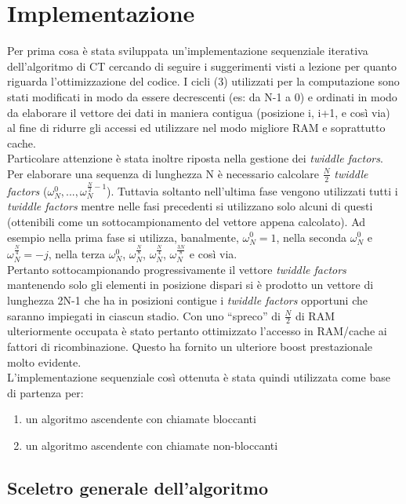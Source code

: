 \documentclass[12pt,a4paper,oneside,openright]{article}
\begin{document}
\section{Implementazione}
Per prima cosa è stata sviluppata un'implementazione sequenziale iterativa dell'algoritmo di CT cercando di seguire i suggerimenti visti a lezione per quanto riguarda l'ottimizzazione del codice. I cicli (3) utilizzati per la computazione sono stati modificati in modo da essere decrescenti (es: da N-1 a 0) e ordinati in modo da elaborare il vettore dei dati in maniera contigua (posizione i, i+1, e così via) al fine di ridurre gli accessi ed utilizzare nel modo migliore RAM e soprattutto cache.\\
Particolare attenzione è stata inoltre riposta nella gestione dei \emph{twiddle factors}.\\
Per elaborare una sequenza di lunghezza N è necessario calcolare $\frac{N}{2}$ \emph{twiddle factors} ($ \omega_{N}^{0},...,\omega_{N}^{\frac{N}{2}-1}$). Tuttavia soltanto nell'ultima fase vengono utilizzati tutti i \emph{twiddle factors} mentre nelle fasi precedenti si utilizzano solo alcuni di questi (ottenibili come un sottocampionamento del vettore appena calcolato). Ad esempio nella prima fase si utilizza, banalmente, $ \omega_{N}^{0}=1$, nella seconda $ \omega_{N}^{0}$ e $\omega_{N}^{\frac{N}{4}}=-j$, nella terza $ \omega_{N}^{0}$, $\omega_{N}^{\frac{N}{8}}$, $\omega_{N}^{\frac{N}{4}}$, $\omega_{N}^{\frac{3N}{8}}$ e così via.\\
Pertanto sottocampionando progressivamente il vettore \emph{twiddle factors} mantenendo solo gli elementi in posizione dispari si è prodotto un vettore di lunghezza 2N-1 che ha in posizioni contigue i \emph{twiddle factors} opportuni che saranno impiegati in ciascun stadio. Con uno ``spreco'' di $\frac{N}{2}$ di RAM ulteriormente occupata è stato pertanto ottimizzato l'accesso in RAM/cache ai fattori di ricombinazione. Questo ha fornito un ulteriore boost prestazionale molto evidente.\\
L'implementazione sequenziale così ottenuta è stata quindi utilizzata come base di partenza per:
\begin{enumerate}
\item un algoritmo ascendente con chiamate bloccanti
\item un algoritmo ascendente con chiamate non-bloccanti
\end{enumerate}
\subsection{Sceletro generale dell'algoritmo}
\end{document}
